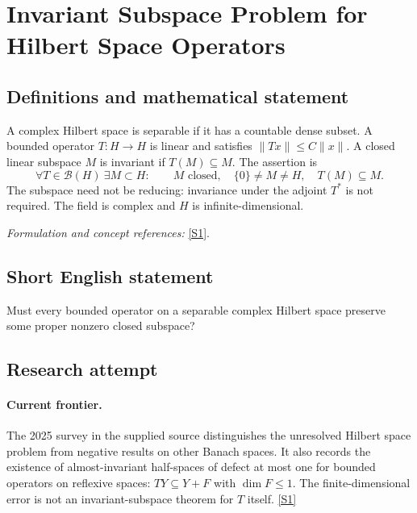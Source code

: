 \documentclass[11pt,a4paper]{article}
\newcommand{\sref}[2]{\hyperlink{source:#1:#2}{[S#2]}}
\newif\ifshowcatalogue
\newcommand{\cataloguescope}[1]{\ifshowcatalogue
 \paragraph{Exact scope in the supplied catalogue.}
 \begin{quote}\small #1\end{quote}\fi}
\numberwithin{equation}{section}
\begin{document}
\setcounter{section}{107}
\clearpage
\section{\texorpdfstring{Invariant Subspace Problem for Hilbert Space Operators}{Invariant Subspace Problem for Hilbert Space Operators}}\label{108}
\subsection{Definitions and mathematical statement}
A complex Hilbert space is separable if it has a countable dense subset. A bounded operator $T:H\to H$ is linear and satisfies $\|Tx\|\le C\|x\|$. A closed linear subspace $M$ is invariant if $T(M)\subseteq M$. The assertion is
\[
 \forall T\in\mathcal B(H)\ \exists M\subset H:\qquad
 M\text{ closed},\quad\{0\}\ne M\ne H,\quad T(M)\subseteq M.
\]
The subspace need not be reducing: invariance under the adjoint $T^*$ is not required. The field is complex and $H$ is infinite-dimensional.
\par\smallskip\textit{Formulation and concept references:} \sref{108}{1}.
\cataloguescope{Does every bounded linear operator T on an infinite-dimensional separable complex Hilbert space H have a nontrivial closed invariant subspace, that is, a closed subspace M with \{0\} != M != H such that T(M) is a subset of M?}
\subsection{Short English statement}
Must every bounded operator on a separable complex Hilbert space preserve some proper nonzero closed subspace?
\subsection{Research attempt}

\paragraph{Current frontier.}
The 2025 survey in the supplied source distinguishes the unresolved Hilbert
space problem from negative results on other Banach spaces. It also records
the existence of almost-invariant half-spaces of defect at most one for
bounded operators on reflexive spaces: $TY\subseteq Y+F$ with
$\dim F\leq1$. The finite-dimensional error is not an invariant-subspace
theorem for $T$ itself. \sref{108}{1}
\end{document}
